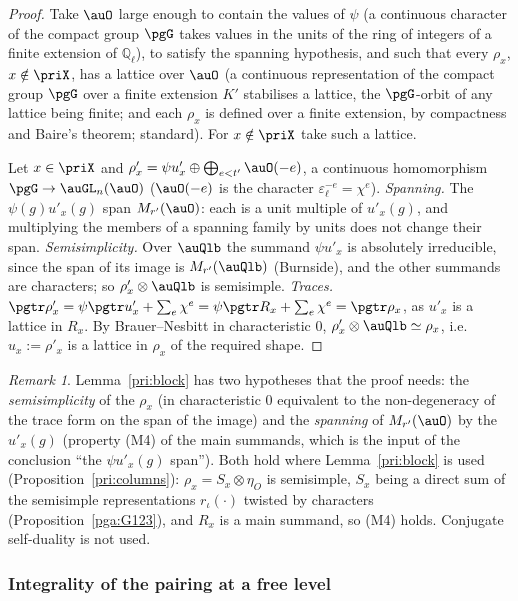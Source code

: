 \documentclass[10pt]{amsart}
\theoremstyle{definition}
\theoremstyle{remark}
\newtheorem{remark}[theorem]{Remark}
\newcommand{\Q}{\mathbb Q}
\begin{document}
\begin{proof}
Take $\auO$ large enough to contain the values of $\psi$ (a continuous character of the compact group
$\pgG$ takes values in the units of the ring of integers of a finite extension of $\Q_\ell$), to
satisfy the spanning hypothesis, and such that every $\rho_x$, $x\notin\priX$, has a lattice over
$\auO$ (a continuous representation of the compact group $\pgG$ over a finite extension $K'$ stabilises
a lattice, the $\pgG$-orbit of any lattice being finite; and each $\rho_x$ is defined over a finite
extension, by compactness and Baire's theorem; standard). For $x\notin\priX$ take such a lattice.

Let $x\in\priX$ and $\rho'_x=\psi u'_x\oplus\bigoplus_{e<t'}\auO(-e)$, a continuous homomorphism
$\pgG\to\auGL_n(\auO)$ ($\auO(-e)$ is the character $\varepsilon_\ell^{-e}=\chi^e$). \emph{Spanning.}
The $\psi(g)u'_x(g)$ span $M_{r'}(\auO)$: each is a unit multiple of $u'_x(g)$, and multiplying the
members of a spanning family by units does not change their span. \emph{Semisimplicity.} Over
$\auQlb$ the summand $\psi u'_x$ is absolutely irreducible, since the span of its image is
$M_{r'}(\auQlb)$ (Burnside), and the other summands are characters; so $\rho'_x\otimes\auQlb$ is
semisimple. \emph{Traces.} $\pgtr\rho'_x=\psi\pgtr u'_x+\sum_e\chi^e=\psi\pgtr R_x+\sum_e\chi^e=
\pgtr\rho_x$, as $u'_x$ is a lattice in $R_x$. By Brauer--Nesbitt in characteristic $0$, $\rho'_x
\otimes\auQlb\simeq\rho_x$, i.e.\ $u_x:=\rho'_x$ is a lattice in $\rho_x$ of the required shape.
\end{proof}

\begin{remark}\label{pax:rem-block}
Lemma~\ref{pri:block} has two hypotheses that the proof needs: the \emph{semisimplicity} of the
$\rho_x$ (in characteristic $0$ equivalent to the non-degeneracy of the trace form on the span of the
image) and the \emph{spanning} of $M_{r'}(\auO)$ by the $u'_x(g)$ (property (M4) of the main
summands, which is the input of the conclusion ``the $\psi u'_x(g)$ span''). Both hold where
Lemma~\ref{pri:block} is used (Proposition~\ref{pri:columns}): $\rho_x=S_x\otimes\eta_O$ is
semisimple, $S_x$ being a direct sum of the semisimple representations $r_\iota(\cdot)$ twisted by
characters (Proposition~\ref{pga:G123}), and $R_x$ is a main summand, so (M4) holds. Conjugate
self-duality is not used.
\end{remark}

\subsubsection{Integrality of the pairing at a free level}\label{pax:ss-pairing}
\end{document}
